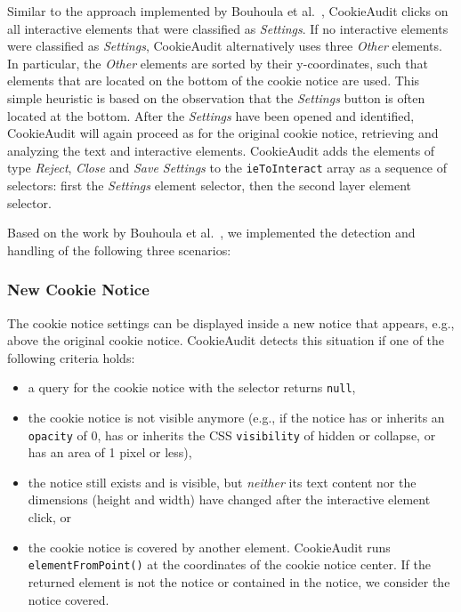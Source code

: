 Similar to the approach implemented by Bouhoula et al.~\cite{bouhoula2023automated}, CookieAudit clicks on all interactive elements that were classified as \emph{Settings}.
If no interactive elements were classified as \emph{Settings}, CookieAudit alternatively uses three \emph{Other} elements. 
In particular, the \emph{Other} elements are sorted by their y-coordinates, such that elements that are located on the bottom of the cookie notice are used.
This simple heuristic is based on the observation that the \emph{Settings} button is often located at the bottom.
After the \emph{Settings} have been opened and identified, CookieAudit will again proceed as for the original cookie notice, retrieving and analyzing the text and interactive elements.
CookieAudit adds the elements of type \emph{Reject}, \emph{Close} and \emph{Save Settings} to the \texttt{ieToInteract} array as a sequence of selectors: first the \emph{Settings} element selector, then the second layer element selector. 

Based on the work by Bouhoula et al.~\cite{bouhoula2023automated}, we implemented the detection and handling of the following three scenarios:

\subsubsection{New Cookie Notice}
The cookie notice settings can be displayed inside a new notice that appears, e.g., above the original cookie notice. 
CookieAudit detects this situation if one of the following criteria holds:

\begin{itemize} 
    \item a query for the cookie notice with the selector returns \texttt{null},
    \item the cookie notice is not visible anymore (e.g., if the notice has or inherits an \texttt{opacity} of 0, has or inherits the CSS \texttt{visibility} of hidden or collapse, or has an area of 1 pixel or less),
    \item the notice still exists and is visible, but \emph{neither} its text content nor the dimensions (height and width) have changed after the interactive element click, or
    \item the cookie notice is covered by another element. CookieAudit runs \texttt{elementFromPoint()} at the coordinates of the cookie notice center. If the returned element is not the notice or contained in the notice, we consider the notice covered.
\end{itemize}

